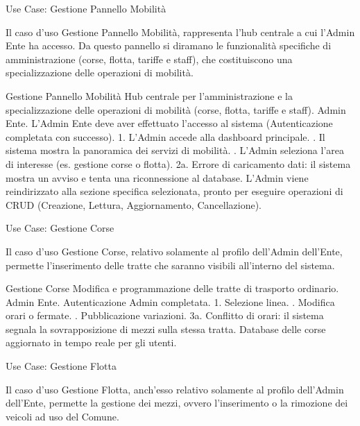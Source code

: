 \begin{center}
    {Use Case: Gestione Pannello Mobilità}
\end{center}
Il caso d'uso Gestione Pannello Mobilità, rappresenta l'hub centrale a cui l'Admin Ente ha accesso. Da questo pannello si diramano le funzionalità specifiche di amministrazione (corse, flotta, tariffe e staff), che costituiscono una specializzazione delle operazioni di mobilità.

\vspace{0.5cm}

\usecasetable
{Gestione Pannello Mobilità}
{Hub centrale per l'amministrazione e la specializzazione delle operazioni di mobilità (corse, flotta, tariffe e staff).}
{Admin Ente.}
{L'Admin Ente deve aver effettuato l'accesso al sistema (Autenticazione completata con successo).}
{1. L'Admin accede alla dashboard principale. . Il sistema mostra la panoramica dei servizi di mobilità. . L'Admin seleziona l'area di interesse (es. gestione corse o flotta).}
{2a. Errore di caricamento dati: il sistema mostra un avviso e tenta una riconnessione al database.}
{L'Admin viene reindirizzato alla sezione specifica selezionata, pronto per eseguire operazioni di CRUD (Creazione, Lettura, Aggiornamento, Cancellazione).}
\newpage

\begin{center}
    {Use Case: Gestione Corse}
\end{center}
Il caso d'uso Gestione Corse, relativo solamente al profilo dell'Admin dell'Ente, permette l'inserimento delle tratte che saranno visibili all'interno del sistema.

\vspace{0.5cm}

\usecasetable
{Gestione Corse}
{Modifica e programmazione delle tratte di trasporto ordinario.}
{Admin Ente.}
{Autenticazione Admin completata.}
{1. Selezione linea. . Modifica orari o fermate. . Pubblicazione variazioni.}
{3a. Conflitto di orari: il sistema segnala la sovrapposizione di mezzi sulla stessa tratta.}
{Database delle corse aggiornato in tempo reale per gli utenti.}

\vspace{0.5cm}

\begin{center}
    {Use Case: Gestione Flotta}
\end{center}
Il caso d'uso Gestione Flotta, anch'esso relativo solamente al profilo dell'Admin dell'Ente, permette la gestione dei mezzi, ovvero l'inserimento o la rimozione dei veicoli ad uso del Comune.

